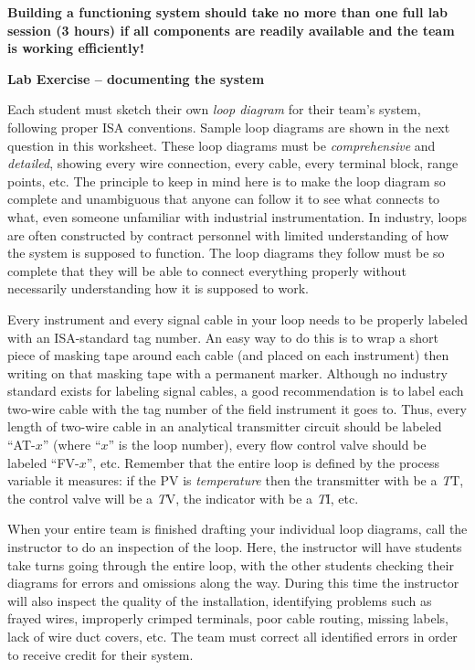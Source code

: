 \documentclass[12pt,a4paper]{article}
\begin{document}
\vskip 10pt

{\bf Building a functioning system should take no more than one full lab session (3 hours) if all components are readily available and the team is working efficiently!}





\vfil \eject

\noindent
{\bf Lab Exercise -- documenting the system}

\vskip 5pt

Each student must sketch their own {\it loop diagram} for their team's system, following proper ISA conventions.  Sample loop diagrams are shown in the next question in this worksheet.  These loop diagrams must be {\it comprehensive} and {\it detailed}, showing every wire connection, every cable, every terminal block, range points, etc.  The principle to keep in mind here is to make the loop diagram so complete and unambiguous that anyone can follow it to see what connects to what, even someone unfamiliar with industrial instrumentation.  In industry, loops are often constructed by contract personnel with limited understanding of how the system is supposed to function.  The loop diagrams they follow must be so complete that they will be able to connect everything properly without necessarily understanding how it is supposed to work.

Every instrument and every signal cable in your loop needs to be properly labeled with an ISA-standard tag number.  An easy way to do this is to wrap a short piece of masking tape around each cable (and placed on each instrument) then writing on that masking tape with a permanent marker.  Although no industry standard exists for labeling signal cables, a good recommendation is to label each two-wire cable with the tag number of the field instrument it goes to.  Thus, every length of two-wire cable in an analytical transmitter circuit should be labeled ``AT-$x$'' (where ``$x$'' is the loop number), every flow control valve should be labeled ``FV-$x$'', etc.  Remember that the entire loop is defined by the process variable it measures: if the PV is {\it temperature} then the transmitter with be a {\it T}T, the control valve will be a {\it T}V, the indicator with be a {\it T}I, etc.

When your entire team is finished drafting your individual loop diagrams, call the instructor to do an inspection of the loop.  Here, the instructor will have students take turns going through the entire loop, with the other students checking their diagrams for errors and omissions along the way.  During this time the instructor will also inspect the quality of the installation, identifying problems such as frayed wires, improperly crimped terminals, poor cable routing, missing labels, lack of wire duct covers, etc.  The team must correct all identified errors in order to receive credit for their system.  
\end{document}
